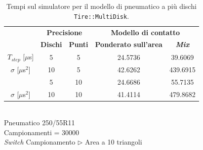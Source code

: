 \begin{table}
	\centering
	\begin{tabular}{c|c|c|c|c|}
		\cline{2-5} 
		& \multicolumn{2}{c|}{\textbf{Precisione}} &\multicolumn{2}{c|}{\textbf{Modello di contatto}} \\
		\cline{2-5} 
		& \textbf{Dischi} & \textbf{Punti} & \textbf{Ponderato sull'area} & \textbf{\textit{Mix}} \\ 
		\hline
		\multicolumn{1}{|c|}{$T_{step}$ [$\mu$s]} & 5 & 5 & 24.5736 & 39.6069 \\ 
		\hline 
		\multicolumn{1}{|c|}{$\sigma$ [$\mu$s$^2$]} & 10 & 5 & 42.6262 & 439.6915 \\ 
		\hhline{=====}
		
		\multicolumn{1}{|c|}{$T_{step}$ [$\mu$s]} & 5 & 10 & 24.6686 & 55.7135 \\ 
		\hline 
		\multicolumn{1}{|c|}{$\sigma$ [$\mu$s$^2$]} & 10 & 10 & 41.4114 & 479.8682 \\ 
		\hline
	\end{tabular}
	\\[0.5cm]
	Pneumatico 250/55R11\\
	Campionamenti = 30000\\
	\textit{Switch} Campionamento $\triangleright$ Area a 10 triangoli
	\caption{Tempi sul simulatore per il modello di pneumatico a più dischi \texttt{Tire::MultiDisk}.}
	\label{MD}
\end{table}
